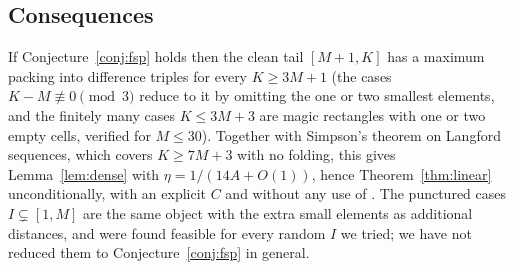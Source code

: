 \subsection{Consequences}

If Conjecture~\ref{conj:fsp} holds then the clean tail $[M+1,K]$ has a
maximum packing into difference triples for every $K\ge3M+1$ (the cases
$K-M\not\equiv0\pmod3$ reduce to it by omitting the one or two smallest
elements, and the finitely many cases $K\le3M+3$ are magic rectangles with one
or two empty cells, verified for $M\le30$).  Together with Simpson's theorem
on Langford sequences, which covers $K\ge7M+3$ with no folding, this gives
Lemma~\ref{lem:dense} with
$\eta=1/(14A+O(1))$, hence Theorem~\ref{thm:linear} unconditionally, with an
explicit $C$ and without any use of \cite{MuyesserPokrovskiy2025}.  The punctured
cases $I\subsetneq[1,M]$ are the same object with the extra small elements
as additional distances, and were found feasible for every random $I$ we
tried; we have not reduced them to Conjecture~\ref{conj:fsp} in general.
